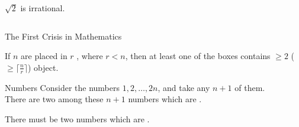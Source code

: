 
\begin{frame}{}
  \begin{theorem}
    $\sqrt{2}$ is irrational.
  \end{theorem}

  \begin{columns}
  \end{columns}
  \begin{center}
    The First Crisis in Mathematics
  \end{center}
\end{frame}


\begin{frame}{}

  \begin{theorem}
    If $n$  are placed in $r$ , where $r < n$,
    then at least one of the boxes contains $\ge 2$
    ($\ge \lceil \frac{n}{r} \rceil$) object.
  \end{theorem}
\end{frame}

\begin{frame}{}
  \begin{exampleblock}{Numbers}
    Consider the numbers $1, 2, \dots, 2n$, and take any $n+1$ of them. \\
    There are two among these $n+1$ numbers which are .
  \end{exampleblock}

  \pause
  \vspace{0.30cm}
  \begin{center}
    There must be two numbers which are .
  \end{center}
\end{frame}

